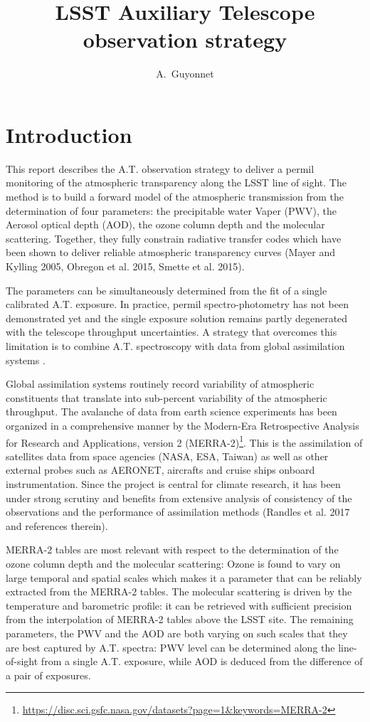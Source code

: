 \documentclass[DM,authoryear,toc,lsstdraft]{lsstdoc}
\title{LSST Auxiliary Telescope observation strategy}
\author{
A.~Guyonnet
}
\date{\vcsDate}
\begin{document}
\maketitle

\section*{Introduction}

This report describes the A.T. observation strategy to deliver a permil monitoring of the atmospheric transparency along the LSST line of sight. The method is to build a forward model of the atmospheric transmission from the determination of four parameters: the precipitable water Vaper (PWV), the Aerosol optical depth (AOD), the ozone column depth and the molecular scattering. Together, they fully constrain radiative transfer codes which have been shown to deliver reliable atmospheric transparency curves (Mayer and Kylling 2005, Obregon et al. 2015, Smette et al. 2015). 


The parameters can be simultaneously determined from the fit of a single calibrated A.T. exposure. In practice, permil spectro-photometry has not been demonstrated yet and the single exposure solution remains partly degenerated with the telescope throughput uncertainties. A strategy that overcomes this limitation is to combine A.T. spectroscopy with data from global assimilation systems \citep{2018SPIE10704E..20C}.

Global assimilation systems routinely record variability of atmospheric constituents that translate into sub-percent variability of the atmospheric throughput. The avalanche of data from earth science experiments has been organized in a comprehensive manner by the Modern-Era Retrospective Analysis for Research and Applications, version 2 (MERRA-2)\footnote{\url{https://disc.sci.gsfc.nasa.gov/datasets?page=1&keywords=MERRA-2}}. This is the assimilation of satellites data from space agencies (NASA, ESA, Taiwan) as well as other external probes such as AERONET, aircrafts and cruise ships onboard instrumentation. Since the project is central for climate research, it has been under strong scrutiny and benefits from extensive analysis of consistency of the observations and the performance of assimilation methods (Randles et al. 2017 and references therein).

MERRA-2 tables are most relevant with respect to the determination of the ozone column depth and the molecular scattering: Ozone is found to vary on large temporal and spatial scales which makes it a parameter that can be reliably extracted from the MERRA-2 tables. The molecular scattering is driven by the temperature and barometric profile: it can be retrieved with sufficient precision from the interpolation of MERRA-2 tables above the LSST site. The remaining parameters, the PWV and the AOD are both varying on such scales that they are best captured by A.T. spectra: PWV level can be determined along the line-of-sight from a single A.T. exposure, while AOD is deduced from the difference of a pair of exposures. 
\end{document}
